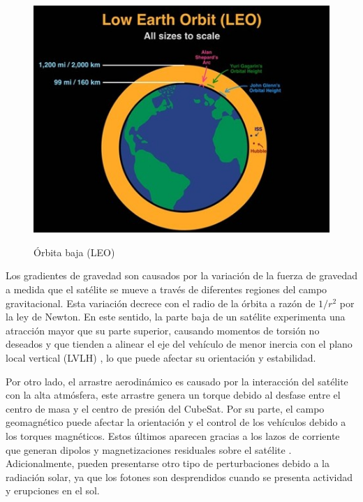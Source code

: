 \begin{figure}[!ht]
	\begin{center}
		\includegraphics[scale=1]{imagenes/marco_teorico/leo.jpg}\\
	\end{center}
	\caption{  Órbita baja (LEO)\cite{opc:LEO}}
	\label{fig:leo}
\end{figure}

Los gradientes de gravedad son causados por la variación de la fuerza de gravedad a medida que el satélite se mueve a través de diferentes regiones del campo gravitacional. Esta variación decrece con el radio de la órbita a razón de $1/r^2$ por la ley de Newton. En este sentido, la parte baja de un satélite experimenta una atracción mayor que su parte superior, causando momentos de torsión no deseados y que tienden a alinear el eje del vehículo de menor inercia con el plano local vertical (LVLH) \cite{griffin2004space}, lo que puede afectar su orientación y estabilidad.

Por otro lado, el arrastre aerodinámico es causado por la interacción del satélite con la alta atmósfera, este arrastre genera un torque debido al desfase entre el centro de masa y el centro de presión del CubeSat. Por su parte, el campo geomagnético puede afectar la orientación y el control de los vehículos debido a los torques magnéticos. Estos últimos aparecen gracias a los lazos de corriente que generan dipolos y magnetizaciones residuales sobre el satélite \cite{Giesselman2006}. Adicionalmente, pueden presentarse otro tipo de perturbaciones debido a la radiación solar, ya que los fotones son desprendidos cuando se presenta actividad y erupciones en el sol.

